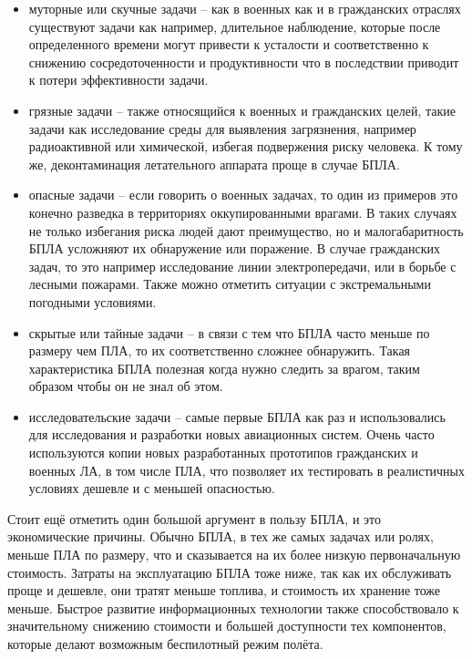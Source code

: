 \documentclass{itmo-student-thesis}
\begin{document}
\begin{itemize}
  \item муторные или скучные задачи -- как в военных как и в гражданских
    отраслях существуют задачи как например, длительное наблюдение, которые
    после определенного времени могут привести к усталости и соответственно к
    снижению сосредоточенности и продуктивности что в последствии приводит к
    потери эффективности задачи.
  \item грязные задачи -- также относящийся к военных и гражданских целей, такие
    задачи как исследование среды для выявления загрязнения, например
    радиоактивной или химической, избегая подвержения риску человека. К тому же,
    деконтаминация летательного аппарата проще в случае БПЛА.
  \item опасные задачи -- если говорить о военных задачах, то один из примеров
    это конечно разведка в территориях оккупированными врагами. В таких случаях
    не только избегания риска людей дают преимущество, но и малогабаритность
    БПЛА усложняют их обнаружение или поражение. В случае гражданских задач, то
    это например исследование линии электропередачи, или в борьбе с лесными
    пожарами. Также можно отметить ситуации с экстремальными погодными
    условиями.
  \item скрытые или тайные задачи -- в связи с тем что БПЛА часто меньше по
    размеру чем ПЛА, то их соответственно сложнее обнаружить. Такая
    характеристика БПЛА полезная когда нужно следить за врагом, таким образом
    чтобы он не знал об этом.
  \item исследовательские задачи -- самые первые БПЛА как раз и использовались
    для исследования и разработки новых авиационных систем. Очень часто
    используются копии новых разработанных прототипов гражданских и военных ЛА,
    в том числе ПЛА, что позволяет их тестировать в реалистичных условиях
    дешевле и с меньшей опасностью.
\end{itemize}

Стоит ещё отметить один большой аргумент в пользу БПЛА, и это экономические
причины. Обычно БПЛА, в тех же самых задачах или ролях, меньше ПЛА по размеру,
что и сказывается на их более низкую первоначальную стоимость. Затраты на
эксплуатацию БПЛА тоже ниже, так как их обслуживать проще и дешевле, они тратят
меньше топлива, и стоимость их хранение тоже меньше. Быстрое развитие
информационных технологии также способствовало к значительному снижению
стоимости и большей доступности тех компонентов, которые делают возможным
беспилотный режим полёта.
\end{document}
